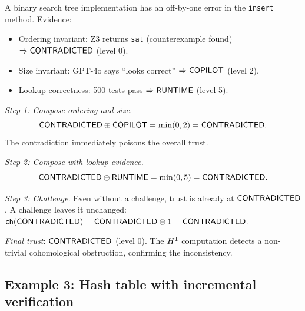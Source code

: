 \documentclass[11pt]{article}
\begin{document}
\begin{example}\label{ex:bst}
A binary search tree implementation has an off-by-one error
in the \texttt{insert} method.  Evidence:
\begin{itemize}[nosep]
  \item Ordering invariant: Z3 returns \texttt{sat}
        (counterexample found) $\Rightarrow \mathsf{CONTRADICTED}$ (level 0).
  \item Size invariant: GPT-4o says ``looks correct''
        $\Rightarrow \mathsf{COPILOT}$ (level 2).
  \item Lookup correctness: 500 tests pass
        $\Rightarrow \mathsf{RUNTIME}$ (level 5).
\end{itemize}

\emph{Step 1: Compose ordering and size.}
\[
  \mathsf{CONTRADICTED} \oplus \mathsf{COPILOT} = \min(0, 2) = \mathsf{CONTRADICTED}.
\]
The contradiction immediately poisons the overall trust.

\emph{Step 2: Compose with lookup evidence.}
\[
  \mathsf{CONTRADICTED} \oplus \mathsf{RUNTIME} = \min(0, 5) = \mathsf{CONTRADICTED}.
\]

\emph{Step 3: Challenge.}
Even without a challenge, trust is already at $\mathsf{CONTRADICTED}$.
A challenge leaves it unchanged:
$\mathsf{ch}(\mathsf{CONTRADICTED}) = \mathsf{CONTRADICTED} \ominus 1 = \mathsf{CONTRADICTED}$.

\emph{Final trust}: $\mathsf{CONTRADICTED}$ (level 0).
The $H^{1}$ computation detects a non-trivial
cohomological obstruction, confirming the inconsistency.
\end{example}

\subsection{Example 3: Hash table with incremental verification}
\label{sec:ex-hashtable}
\end{document}
